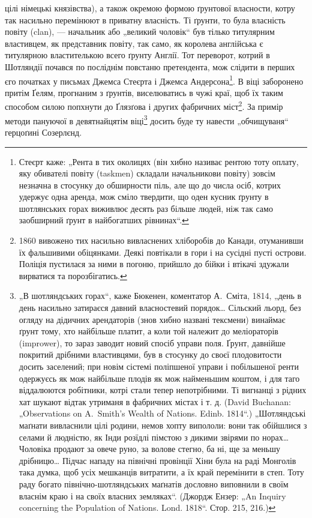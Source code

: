 \parcont{}
цілі німецькі князівства), а також окремою формою ґрунтової власности, котру так насильно перемінюют
в приватну власність. Ті ґрунти, то була власність повіту (clan), — начальник або „великий чоловік“
був тілько титулярним властивцем, як представник повіту, так само, як королева англійська є
титулярною властителькою всего ґрунту Англії. Тот переворот, котрий в Шотляндії почався по посліднім
повстаню претендента, мож слідити в перших єго початках у письмах Джемса Стеєрта і Джемса Андерсона\footnote{
Стеєрт каже: „Рента в тих околицях (він хибно називає рентою тоту оплату, яку обивателі повіту
(taskmen) складали начальникови повіту) зовсім незначна в стосунку до обширности піль, але що до
числа осіб, котрих удержує одна аренда, мож сміло твердити, що оден кусник ґрунту в шотлянських
горах виживлює десять раз більше людей, ніж так само заобширний ґрунт в найбогатших рівнинах“.
}. В  віці заборонено притім Ґелям, прогнаним з ґрунтів, виселюватись в чужі краї, щоб їх таким
способом силою попхнути до Ґлязґова і других фабричних міст\footnote{
1860 вивожено тих насильно вивласнених хліборобів до Канади, отуманивши їх фальшивими
обіцянками. Деякі повтікали в гори і на сусідні пусті острови. Поліція пустилася за ними в погоню,
прийшло до бійки і втікачі здужали вирватися та порозбігатись.
}. За примір
методи пануючої в девятнайцятім віці\footnote{
„В шотляндських горах“, каже Бюкенен, коментатор А.~Сміта, 1814, „день в день насильно затираєся
давний власностевий порядок\dots{} Сільский льорд, без огляду на дідичних арендаторів (знов хибно
названі тексмени) винаймає ґрунт тому, хто найбільше платит, а коли той належит до меліораторів
(imprower), то зараз заводит новий спосіб управи поля. Ґрунт, давнійше покритий дрібними
властивцями, був в стосунку до своєї плодовитости досить заселений; при новім сістемі поліпшеної
управи і побільшеної ренти одержуєсь як мож найбільше плодів як мож найменьшим коштом, і для таго
віддалюются робітники, котрі стали тепер непотрібними. Ті вигнанці з рідних хат шукают відтак
утриманя в фабричних містах і т. д. (David Buchanan: „Observations on A.~Smith’s Wealth of Nations.
Edinb. 1814“.) „Шотляндські маґнати вивласнили цілі родини, немов хопту випололи: вони так обійшлися
з селами й людністю, як Інди розїдлі пімстою з дикими звірями по норах\dots{} Чоловіка продают
за овече руно, за волове стегно, ба ні, ще за меньшу дрібницю\dots{} Підчас нападу на північні
провінції Хіни була на раді Монголів така думка, щоб усіх мешканців витратити, а їх край перемінити
в степ. Тоту раду богато північно-шотляндських маґнатів дословно виповнили в своїм власнім краю і на
своїх власних земляках“. (Джордж Ензер: „An Inquiry concerning the Population of Nations. Lond.
1818“. Стор. 215, 216.)
} досить буде ту навести „обчищуваня“ герцоґині Созерлєнд.
